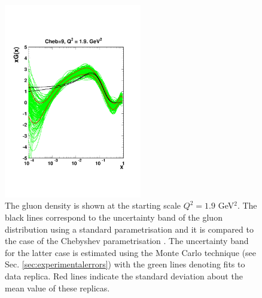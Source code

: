\begin{figure}[!ht]
 \centering
  \includegraphics[trim=1cm 4cm 1cm 5cm, clip, width=6cm]{chebishev.pdf}
  \caption{The gluon density is shown at the starting scale $Q^2=1.9$ GeV$^2$. The black lines correspond to the uncertainty band of the gluon distribution using a standard parametrisation and it is compared to the case of the Chebyshev parametrisation \cite{Chebyshev}. The uncertainty band for the latter case is estimated using the Monte Carlo technique (see Sec. \ref{sec:experimentalerrors}) with the green lines denoting fits to data replica.  Red lines indicate the standard deviation about the mean value of these replicas.}
 \label{fig:cheb}
\end{figure}

%
